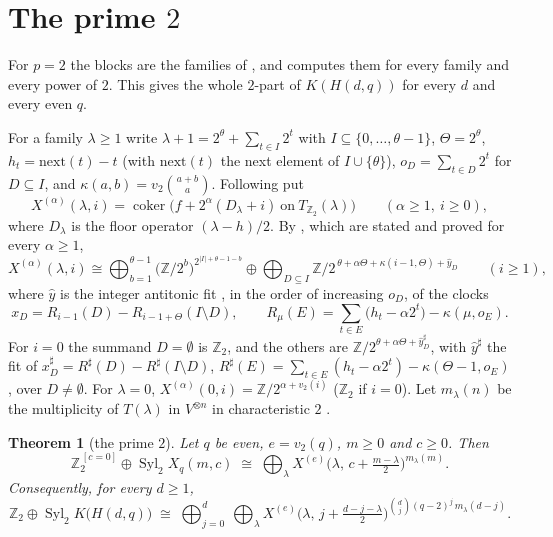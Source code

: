 \documentclass[10pt]{article}
\theoremstyle{ds}
\newtheorem{theorem}{Theorem}
\theoremstyle{dsrem}
\newcommand{\Z}{\mathbb{Z}}
\newcommand{\Syl}{\operatorname{Syl}}
\newcommand{\coker}{\operatorname{coker}}
\begin{document}
\section{The prime $2$}\label{sec:two}

For $p=2$ the blocks are the families of \cite{DST}, and \cite{DST} computes them for every family and every power of $2$. This gives the whole $2$-part of $K(H(d,q))$ for every $d$ and every even $q$.

For a family $\lambda\ge1$ write $\lambda+1=2^{\theta}+\sum_{t\in I}2^t$ with $I\subseteq\{0,\dots,\theta-1\}$, $\Theta=2^\theta$, $h_t=\mathrm{next}(t)-t$ (with $\mathrm{next}(t)$ the next element of $I\cup\{\theta\}$), $o_D=\sum_{t\in D}2^t$ for $D\subseteq I$, and $\kappa(a,b)=v_2\binom{a+b}{a}$. Following \cite[§3.4]{DST} put
\[
X^{(\alpha)}(\lambda,i)=\coker\big(f+2^\alpha(D_\lambda+i)\ \text{on}\ T_{\Z_2}(\lambda)\big)\qquad(\alpha\ge1,\ i\ge0),
\]
where $D_\lambda$ is the floor operator $(\lambda-h)/2$. By \cite[Theorem~D, Proposition~5.4, Theorem~7.10]{DST}, which are stated and proved for every $\alpha\ge1$,
\[
X^{(\alpha)}(\lambda,i)\cong\bigoplus_{b=1}^{\theta-1}\big(\Z/2^b\big)^{2^{|I|+\theta-1-b}}\oplus\bigoplus_{D\subseteq I}\Z/2^{\,\theta+\alpha\Theta+\kappa(i-1,\Theta)+\hat y_D}\qquad(i\ge1),
\]
where $\hat y$ is the integer antitonic fit \cite[§1.2]{DST}, in the order of increasing $o_D$, of the clocks
\[
x_D=R_{i-1}(D)-R_{i-1+\Theta}(I\setminus D),\qquad R_\mu(E)=\sum_{t\in E}\big(h_t-\alpha2^t\big)-\kappa(\mu,o_E).
\]
For $i=0$ the summand $D=\emptyset$ is $\Z_2$, and the others are $\Z/2^{\theta+\alpha\Theta+\hat y^\sharp_D}$, with $\hat y^\sharp$ the fit of $x^\sharp_D=R^\sharp(D)-R^\sharp(I\setminus D)$, $R^\sharp(E)=\sum_{t\in E}(h_t-\alpha2^t)-\kappa(\Theta-1,o_E)$, over $D\ne\emptyset$. For $\lambda=0$, $X^{(\alpha)}(0,i)=\Z/2^{\alpha+v_2(i)}$ ($\Z_2$ if $i=0$). Let $m_\lambda(n)$ be the multiplicity of $T(\lambda)$ in $V^{\otimes n}$ in characteristic $2$ \cite[§1.2, Theorem~3.6]{DST}.

\begin{theorem}[the prime $2$]\label{thP}
Let $q$ be even, $e=v_2(q)$, $m\ge0$ and $c\ge0$. Then
\[
\Z_2^{\,[c=0]}\oplus\Syl_2X_q(m,c)\;\cong\;\bigoplus_{\lambda}X^{(e)}\big(\lambda,\,c+\tfrac{m-\lambda}{2}\big)^{m_\lambda(m)}.
\]
Consequently, for every $d\ge1$,
\[
\Z_2\oplus\Syl_2K\big(H(d,q)\big)\;\cong\;\bigoplus_{j=0}^{d}\ \bigoplus_{\lambda}X^{(e)}\big(\lambda,\,j+\tfrac{d-j-\lambda}{2}\big)^{\binom dj(q-2)^j\,m_\lambda(d-j)} .
\]
\end{theorem}
\end{document}
